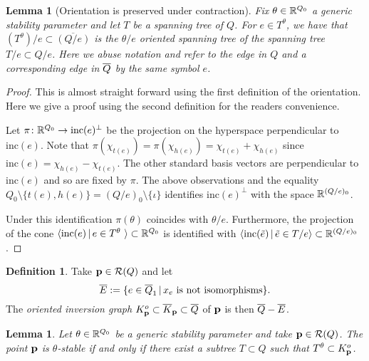 \documentclass{amsart}
\newtheorem{lem}[thm]{Lemma}
\theoremstyle{definition}
\newtheorem{defn}[thm]{Definition}
\begin{document}
\begin{lem}[Orientation is preserved under contraction]\label{lm:stab}
Fix $\theta \in \mathbb{R}^{Q_0}$ a generic stability parameter and let $T$ be a spanning tree of $Q$.
For $e \in T^\theta$, we have that $(T^\theta)/e \subset \overline{(Q/e)}$ is the $\theta/e$ oriented spanning tree of the spanning tree $T/e \subset Q/e$.
Here we abuse notation and refer to the edge in $Q$ and a corresponding edge in ${\overline{Q}}$ by the same symbol $e$.
\end{lem}

\begin{proof}
This is almost straight forward using the first definition of the orientation.
Here we give a proof using the second definition for the readers convenience.

Let $\pi\colon \mathbb{R}^{Q_0}\rightarrow \text{inc}(e)^\perp$ be the projection on the hyperspace perpendicular to $\text{inc}(e)$.
Note that $\pi(\chi_{t(e)}) = \pi(\chi_{h(e)}) = \chi_{t(e)} + \chi_{h(e)}$ since $\text{inc}(e)= \chi_{h(e)} - \chi_{t(e)}.$
The other standard basis vectors are perpendicular to $\text{inc}(e)$ and so are fixed by $\pi$.
The above observations and the equality $Q_0 \setminus \{t(e), h(e)\} = (Q/e)_0 \setminus \{\iota\}$ identifies $\text{inc}(e)^\perp$ with the space $\mathbb{R}^{(Q/e)_0}$.

Under this identification $\pi(\theta)$ coincides with $\theta/e$.
Furthermore, the projection of the cone $\langle \text{inc}(e) \,|\, e\in T^\theta\ \rangle \subset \mathbb{R}^{Q_0}$ is identified with $\langle\text{inc}(\tilde{e}) \, | \, \tilde{e} \in T/e\rangle \subset \mathbb{R}^{(Q/e)_0}$.
\end{proof}

\begin{defn}
Take $\mathbf{p} \in \mathcal{R}(Q)$ and let $${\overline{E}} :=\{e\in {\overline{Q}}_1 \,|\, x_e \text{ is not isomorphisms}\}.$$   
The {\em oriented inversion graph} $K_{\mathbf{p}}^o \subset {\overline{K}}_{\mathbf{p}} \subset {\overline{Q}}$ of $\mathbf{p}$ is then ${\overline{Q}} - {\overline{E}}$.
\end{defn}


\begin{lem}\label{lm:orientedtree}
Let $\theta \in \mathbb{R}^{Q_0}$ be a generic stability parameter and take $\mathbf{p} \in \mathcal{R}(Q)$. 
The point $\mathbf{p}$ is $\theta$-stable if and only if there exist a subtree $T\subset Q$ such that $T^\theta \subset K_{\mathbf{p}}^o$.
\end{lem}
\end{document}
